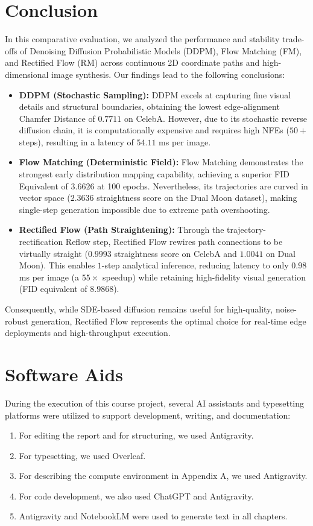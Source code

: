 \documentclass[11pt,a4paper]{article}
\begin{document}
\section{Conclusion}
In this comparative evaluation, we analyzed the performance and stability trade-offs of Denoising Diffusion Probabilistic Models (DDPM), Flow Matching (FM), and Rectified Flow (RM) across continuous 2D coordinate paths and high-dimensional image synthesis. Our findings lead to the following conclusions:
\begin{itemize}
    \item \textbf{DDPM (Stochastic Sampling):} DDPM excels at capturing fine visual details and structural boundaries, obtaining the lowest edge-alignment Chamfer Distance of $0.7711$ on CelebA. However, due to its stochastic reverse diffusion chain, it is computationally expensive and requires high NFEs ($50+$ steps), resulting in a latency of $54.11$ ms per image.
    \item \textbf{Flow Matching (Deterministic Field):} Flow Matching demonstrates the strongest early distribution mapping capability, achieving a superior FID Equivalent of $3.6626$ at 100 epochs. Nevertheless, its trajectories are curved in vector space ($2.3636$ straightness score on the Dual Moon dataset), making single-step generation impossible due to extreme path overshooting.
    \item \textbf{Rectified Flow (Path Straightening):} Through the trajectory-rectification Reflow step, Rectified Flow rewires path connections to be virtually straight ($0.9993$ straightness score on CelebA and $1.0041$ on Dual Moon). This enables $1$-step analytical inference, reducing latency to only $0.98$ ms per image (a $55\times$ speedup) while retaining high-fidelity visual generation (FID equivalent of $8.9868$).
\end{itemize}
Consequently, while SDE-based diffusion remains useful for high-quality, noise-robust generation, Rectified Flow represents the optimal choice for real-time edge deployments and high-throughput execution.

\section{Software Aids}
During the execution of this course project, several AI assistants and typesetting platforms were utilized to support development, writing, and documentation:
\begin{enumerate}
    \item For editing the report and for structuring, we used Antigravity.
    \item For typesetting, we used Overleaf.
    \item For describing the compute environment in Appendix A, we used Antigravity.
    \item For code development, we also used ChatGPT and Antigravity.
    \item Antigravity and NotebookLM were used to generate text in all chapters.
\end{enumerate}
\end{document}
